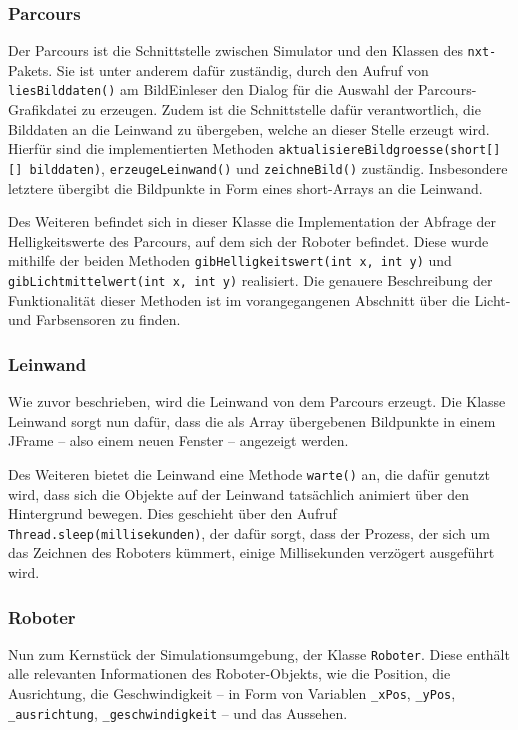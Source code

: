 \documentclass[paper=a4, DIV=calc, BCOR=12mm, twoside=on, onecolumn=on, open = right, titlepage =on, parskip =half-, headsepline = on, footsepline = off, chapterprefix = off, appendixprefix = on, fontsize = 12pt, numbers = noenddot, abstract = on]{scrbook}
\begin{document}
\subsubsection{Parcours}
\label{sec:parcours}
Der Parcours ist die Schnittstelle zwischen Simulator und den Klassen des \texttt{nxt-}Pakets. Sie ist unter anderem dafür zuständig, durch den Aufruf von \texttt{liesBilddaten()} am BildEinleser den Dialog für die Auswahl der Parcours-Grafikdatei zu erzeugen. Zudem ist die Schnittstelle dafür verantwortlich, die Bilddaten an die Leinwand zu übergeben, welche an dieser Stelle erzeugt wird. Hierfür sind die implementierten Methoden \texttt{aktualisiere\-Bildgroes\-se(short[][] bild\-daten)}, \texttt{er\-zeu\-ge\-Lein\-wand()} und \texttt{zeichneBild()} zuständig. Insbesondere letztere übergibt die Bildpunkte in Form eines short-Arrays an die Leinwand.

Des Weiteren befindet sich in dieser Klasse die Implementation der Abfrage der Helligkeitswerte des Parcours, auf dem sich der Roboter befindet. Diese wurde mithilfe der beiden Methoden \texttt{gib\-Hellig\-keits\-wert(int x, int y)} und \texttt{gib\-Licht\-mittel\-wert(int x, int y)} realisiert. Die genauere Beschreibung der Funktionalität dieser Methoden ist im vorangegangenen Abschnitt über die Licht- und Farbsensoren zu finden.

\subsubsection{Leinwand}
Wie zuvor beschrieben, wird die Leinwand von dem Parcours erzeugt. Die Klasse Leinwand sorgt nun dafür, dass die als Array übergebenen Bildpunkte in einem JFrame -- also einem neuen Fenster -- angezeigt werden.

Des Weiteren bietet die Leinwand eine Methode \texttt{warte()} an, die dafür genutzt wird, dass sich die Objekte auf der Leinwand tatsächlich animiert über den Hintergrund bewegen. Dies geschieht über den Aufruf \texttt{Thread.sleep(millise\-kun\-den)}, der dafür sorgt, dass der Prozess, der sich um das Zeichnen des Roboters kümmert, einige Millisekunden verzögert ausgeführt wird.

\subsubsection{Roboter}
Nun zum Kernstück der Simulationsumgebung, der Klasse \texttt{Roboter}. Diese enthält alle relevanten Informationen des Roboter-Objekts, wie die Position, die Ausrichtung, die Geschwindigkeit -- in Form von Variablen \texttt{{\_}xPos}, \texttt{{\_}yPos}, \texttt{{\_}aus\-rich\-tung},  \texttt{{\_}ge\-schwin\-dig\-keit} -- und das Aussehen. 
\end{document}

